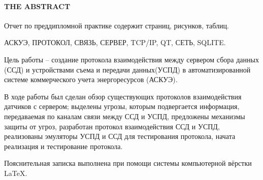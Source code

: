 \newpage
{}
\paragraph*{\hfill THE ABSTRACT \hfill}
Отчет по преддипломной практике содержит  страниц,  рисунков,  таблиц.

АСКУЭ, ПРОТОКОЛ, СВЯЗЬ, СЕРВЕР, TCP/IP, QT, СЕТЬ, SQLITE.

Цель работы -- создание протокола взаимодействия между сервером сбора данных (ССД) и устройствами съема и передачи данных(УСПД) в автоматизированной системе коммерческого учета энергоресурсов (АСКУЭ).

В ходе работы был сделан обзор существующих протоколов взаимодействия датчиков с сервером; выделены угрозы, которым подвергается информация, передаваемая по каналам связи между ССД и УСПД, предложены механизмы защиты от угроз, разработан протокол взаимодействия ССД и УСПД, реализованы эмуляторы УСПД и ССД для тестирования протокола, начата реализация и тестирование протокола.  %

Пояснительная записка выполнена при помощи системы компьютерной вёрстки \LaTeX.